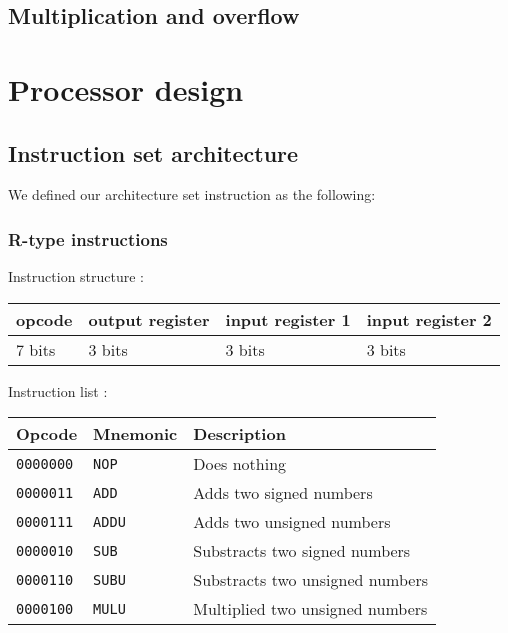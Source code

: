 \documentclass[a4paper]{report}
\begin{document}
\subsection{}

\subsection{Multiplication and overflow}

\section{Processor design}

\subsection{Instruction set architecture}

We defined our architecture set instruction as the following:

\subsubsection{R-type instructions}

Instruction structure :

\begin{center}
	\begin{tabular}{|l|l|l|l|}
		\hline
		opcode & output register & input register 1 & input register 2 \\
		\hline
		7 bits & 3 bits & 3 bits & 3 bits \\
		\hline
	\end{tabular}
\end{center}

Instruction list :

\begin{center}
	\begin{tabular}{|l|l|l|}
		\hline
		Opcode & Mnemonic & Description \\
		\hline \hline
		\texttt{0000000} & \texttt{NOP} &  Does nothing \\
		\texttt{0000011} & \texttt{ADD} &  Adds two signed numbers \\
		\texttt{0000111} & \texttt{ADDU} & Adds two unsigned numbers \\
		\texttt{0000010} & \texttt{SUB} &  Substracts two signed numbers \\
		\texttt{0000110} & \texttt{SUBU} & Substracts two unsigned numbers \\
		\texttt{0000100} & \texttt{MULU} & Multiplied two unsigned numbers \\
		\hline
	\end{tabular}
\end{center}
\end{document}
